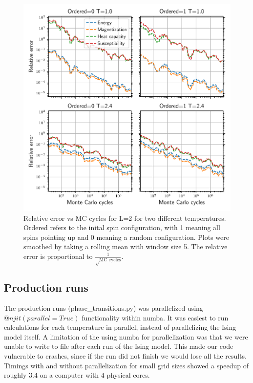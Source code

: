 \begin{figure}[H]
  \centering
  \includegraphics[width=\textwidth]{../figures/relative_error.pdf}
  \caption{Relative error vs MC cycles for L=2 for two different temperatures. Ordered
  refers to the inital spin configuration, with 1 meaning all spins pointing up and
  0 meaning a random configuration. Plots were smoothed by taking a
  rolling mean with window size 5. The relative error is proportional to
  $\frac{1}{\sqrt \text{MC cycles}}$.}
  \label{fig:error_L2}
\end{figure}


\subsection{Production runs}

The production runs (phase\_transitions.py) was parallelized using
$@njit(parallel=True)$ functionality within numba. It was easiest to run
calculations for each temperature in parallel, instead of parallelizing the
Ising model itself. A limitation of the using numba for parallelization was that
we were unable to write to file after each run of the Ising model. This made
our code vulnerable to crashes, since if the run
did not finish we would lose all the results. Timings with and without parallelization for small grid sizes showed a speedup
of roughly 3.4 on a computer with 4 physical cores.

